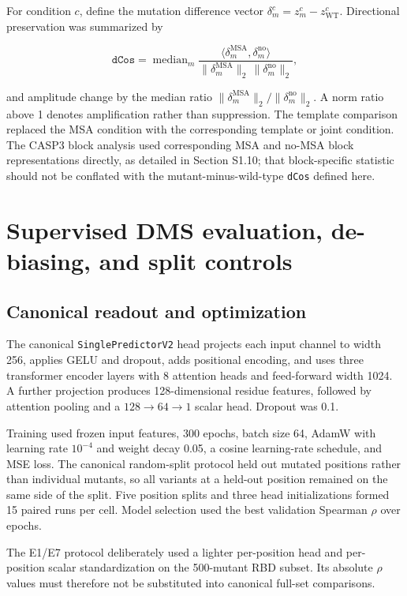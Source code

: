 \documentclass[10pt,a4paper]{article}
\begin{document}
For condition $c$, define the mutation difference vector $\delta_m^{c}=z_m^{c}-z_{\mathrm{WT}}^{c}$. Directional preservation was summarized by

\begin{equation}
\texttt{dCos}=\operatorname{median}_{m}
\frac{\langle\delta_m^{\mathrm{MSA}},\delta_m^{\mathrm{no}}\rangle}
{\lVert\delta_m^{\mathrm{MSA}}\rVert_2\,\lVert\delta_m^{\mathrm{no}}\rVert_2},
\end{equation}

and amplitude change by the median ratio $\lVert\delta_m^{\mathrm{MSA}}\rVert_2/\lVert\delta_m^{\mathrm{no}}\rVert_2$. A norm ratio above 1 denotes amplification rather than suppression. The template comparison replaced the MSA condition with the corresponding template or joint condition. The CASP3 block analysis used corresponding MSA and no-MSA block representations directly, as detailed in Section S1.10; that block-specific statistic should not be conflated with the mutant-minus-wild-type \texttt{dCos} defined here.

\section{Supervised DMS evaluation, de-biasing, and split controls}

\subsection{Canonical readout and optimization}

The canonical \texttt{SinglePredictorV2} head projects each input channel to width 256, applies GELU and dropout, adds positional encoding, and uses three transformer encoder layers with 8 attention heads and feed-forward width 1024. A further projection produces 128-dimensional residue features, followed by attention pooling and a $128\rightarrow64\rightarrow1$ scalar head. Dropout was 0.1.

Training used frozen input features, 300 epochs, batch size 64, AdamW with learning rate $10^{-4}$ and weight decay 0.05, a cosine learning-rate schedule, and MSE loss. The canonical random-split protocol held out mutated positions rather than individual mutants, so all variants at a held-out position remained on the same side of the split. Five position splits and three head initializations formed 15 paired runs per cell. Model selection used the best validation Spearman $\rho$ over epochs.

The E1/E7 protocol deliberately used a lighter per-position head and per-position scalar standardization on the 500-mutant RBD subset. Its absolute $\rho$ values must therefore not be substituted into canonical full-set comparisons.
\end{document}
